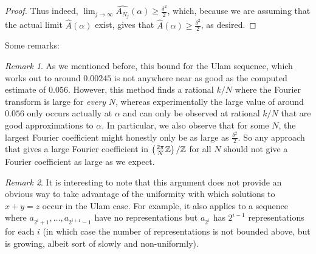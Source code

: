 \documentclass{report}
\theoremstyle{remark}
\newtheorem{remark}{Remark}
\numberwithin{equation}{section}
\begin{document}
\begin{proof}
  Thus indeed,
  $\lim_{j \to \infty} \widehat{A_{N_j}}(\alpha) \geq
  \frac{\delta^2}{2}$, which, because we are assuming that the actual
  limit $\widehat{A}(\alpha)$ exist, gives that
  $\widehat{A}(\alpha) \geq \frac{\delta^2}{2}$, as desired.
\end{proof}

Some remarks: 

\begin{remark}
  As we mentioned before, this bound for the Ulam sequence, which
  works out to around $0.00245$ is not anywhere near as good as the
  computed estimate of $0.056$.  However, this method finds a rational
  $k/N$ where the Fourier transform is large for \textit{every} $N$,
  whereas experimentally the large value of around $0.056$ only occurs
  actually at $\alpha$ and can only be observed at rational $k/N$ that
  are good approximations to $\alpha$.  In particular, we also observe
  that for some $N$, the largest Fourier coefficient might honestly
  only be as large as $\frac{\delta^2}{2}$.  So any approach that
  gives a large Fourier coefficient in
  $\left(\frac{2\pi}{N}\mathbb{Z}\right)/\mathbb{Z}$ for all $N$ should not give a
  Fourier coefficient as large as we expect.
\end{remark}


\begin{remark}
  It is interesting to note that this argument does not provide an
  obvious way to take advantage of the uniformity with which solutions
  to $x+y=z$ occur in the Ulam case.  For example, it also applies to
  a sequence where $a_{2^i+1}, \ldots, a_{2^{i+1}-1}$ have no
  representations but $a_{2^i}$ has $2^{i-1}$ representations for each
  $i$ (in which case the number of representations is not bounded
  above, but is growing, albeit sort of slowly and non-uniformly).
\end{remark}
\end{document}
